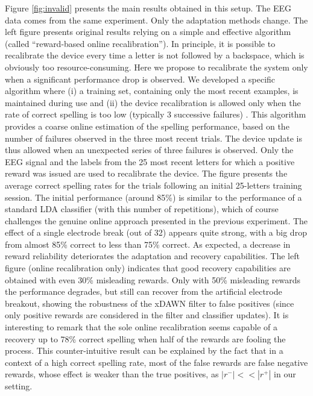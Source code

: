 \documentclass[conference]{IEEEtran}
\begin{document}
Figure \ref{fig:invalid} presents the main results obtained in this setup. The EEG data comes from the same experiment. 
Only the adaptation methods change. 
The left figure presents original results relying on a simple and effective algorithm (called ``reward-based online recalibration'').
In principle, it is possible to recalibrate the device every time a letter is not followed by a backspace, 
which is obviously too resource-consuming. Here we propose to recalibrate the system only when a significant performance drop is observed.
We developed a specific algorithm where (i) a training set, containing only the most recent examples, is maintained during use and 
(ii) the device recalibration is allowed only when the rate of correct spelling is too low (typically 3 successive failures) \cite{Dauce13}.
This algorithm provides a coarse online estimation of the spelling performance, based on the number of failures observed in the three
most recent trials. 
The device update is thus allowed when an unexpected series of three failures is observed.
Only the EEG signal and the labels from the 25 most recent letters for which a positive reward was issued are used to recalibrate the device.   
The figure presents the average correct spelling rates for the trials
following an initial 25-letters training session. The initial performance (around 85\%) is similar to 
the performance of a standard LDA classifier (with this number of repetitions), which of course challenges the genuine online approach
presented in the previous experiment.
The effect of 
a single electrode break (out of 32) appears quite strong, with a big drop from almost 85\% correct to less than
75\% correct.
As expected, a decrease in reward reliability deteriorates the adaptation
and recovery capabilities.
The left figure (online recalibration only) indicates that good recovery capabilities are obtained 
with even 30\% misleading rewards.
Only with 50\% misleading rewards the performance degrades, but still can recover from the artificial electrode breakout,
showing the robustness of the xDAWN filter to false positives (since only positive rewards are
considered in the filter and classifier updates). It is interesting to remark that the sole online recalibration  
seems capable of a recovery up to 78\% correct spelling when half of the rewards are fooling the process. 
This counter-intuitive result can be explained by the fact that in a context of a high correct spelling rate,
most of the false rewards are false negative rewards, whose effect is weaker than the true positives,
as $|r^-|<<|r^+|$ in our setting.
\end{document}
